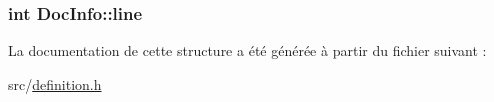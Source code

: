 \subsubsection[{line}]{\setlength{\rightskip}{0pt plus 5cm}int Doc\+Info\+::line}\label{struct_doc_info_aa2776b16e60d965359c3c950cd08cf7d}


La documentation de cette structure a été générée à partir du fichier suivant \+:\begin{DoxyCompactItemize}
\item 
src/\hyperlink{definition_8h}{definition.\+h}\end{DoxyCompactItemize}
